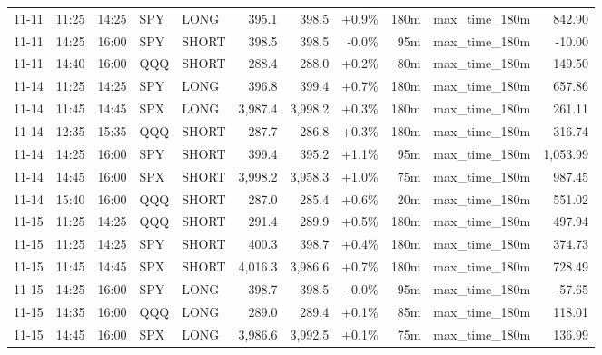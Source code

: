 \documentclass[11pt,a4paper,twoside]{article}
\begin{document}
\begin{center}
\begin{longtable}{>{\color{txtmain}}l l l l l r r r r >{\color{txtmain}}l r}
11-11 & 11:25 & 14:25 & SPY & LONG & 395.1 & 398.5 & \textcolor{wingreen}{+0.9\%} & 180m & max\_time\_180m & \textcolor{wingreen}{842.90} \\
11-11 & 14:25 & 16:00 & SPY & SHORT & 398.5 & 398.5 & \textcolor{wingreen}{-0.0\%} & 95m & max\_time\_180m & \textcolor{lossred}{-10.00} \\
11-11 & 14:40 & 16:00 & QQQ & SHORT & 288.4 & 288.0 & \textcolor{wingreen}{+0.2\%} & 80m & max\_time\_180m & \textcolor{wingreen}{149.50} \\
11-14 & 11:25 & 14:25 & SPY & LONG & 396.8 & 399.4 & \textcolor{wingreen}{+0.7\%} & 180m & max\_time\_180m & \textcolor{wingreen}{657.86} \\
11-14 & 11:45 & 14:45 & SPX & LONG & 3,987.4 & 3,998.2 & \textcolor{wingreen}{+0.3\%} & 180m & max\_time\_180m & \textcolor{wingreen}{261.11} \\
11-14 & 12:35 & 15:35 & QQQ & SHORT & 287.7 & 286.8 & \textcolor{wingreen}{+0.3\%} & 180m & max\_time\_180m & \textcolor{wingreen}{316.74} \\
11-14 & 14:25 & 16:00 & SPY & SHORT & 399.4 & 395.2 & \textcolor{wingreen}{+1.1\%} & 95m & max\_time\_180m & \textcolor{wingreen}{1,053.99} \\
11-14 & 14:45 & 16:00 & SPX & SHORT & 3,998.2 & 3,958.3 & \textcolor{wingreen}{+1.0\%} & 75m & max\_time\_180m & \textcolor{wingreen}{987.45} \\
11-14 & 15:40 & 16:00 & QQQ & SHORT & 287.0 & 285.4 & \textcolor{wingreen}{+0.6\%} & 20m & max\_time\_180m & \textcolor{wingreen}{551.02} \\
11-15 & 11:25 & 14:25 & QQQ & SHORT & 291.4 & 289.9 & \textcolor{wingreen}{+0.5\%} & 180m & max\_time\_180m & \textcolor{wingreen}{497.94} \\
11-15 & 11:25 & 14:25 & SPY & SHORT & 400.3 & 398.7 & \textcolor{wingreen}{+0.4\%} & 180m & max\_time\_180m & \textcolor{wingreen}{374.73} \\
11-15 & 11:45 & 14:45 & SPX & SHORT & 4,016.3 & 3,986.6 & \textcolor{wingreen}{+0.7\%} & 180m & max\_time\_180m & \textcolor{wingreen}{728.49} \\
11-15 & 14:25 & 16:00 & SPY & LONG & 398.7 & 398.5 & \textcolor{lossred}{-0.0\%} & 95m & max\_time\_180m & \textcolor{lossred}{-57.65} \\
11-15 & 14:35 & 16:00 & QQQ & LONG & 289.0 & 289.4 & \textcolor{wingreen}{+0.1\%} & 85m & max\_time\_180m & \textcolor{wingreen}{118.01} \\
11-15 & 14:45 & 16:00 & SPX & LONG & 3,986.6 & 3,992.5 & \textcolor{wingreen}{+0.1\%} & 75m & max\_time\_180m & \textcolor{wingreen}{136.99} \\

\end{longtable}
\end{center}
\end{document}
